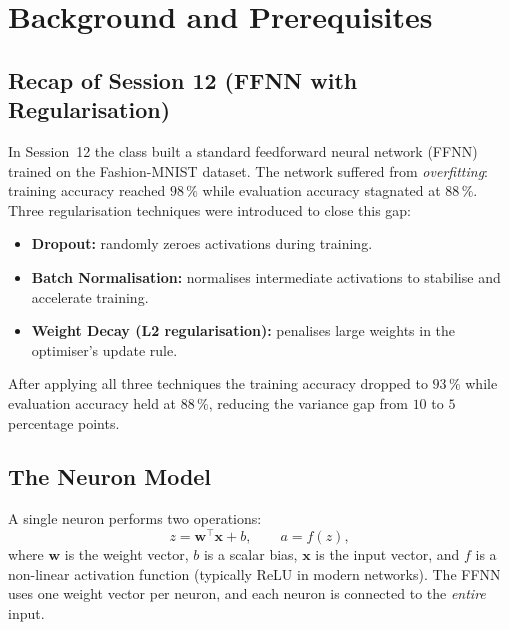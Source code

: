 \documentclass[12pt,a4paper]{article}
\begin{document}
\section{Background and Prerequisites}
\label{sec:background}

\subsection{Recap of Session 12 (FFNN with Regularisation)}
\label{subsec:recap}

In Session~12 the class built a standard feedforward neural network (FFNN)
trained on the Fashion-MNIST dataset.  The network suffered from
\emph{overfitting}: training accuracy reached $98\,\%$ while evaluation
accuracy stagnated at $88\,\%$.  Three regularisation techniques were
introduced to close this gap:

\begin{itemize}[leftmargin=2em]
  \item \textbf{Dropout:} randomly zeroes activations during training.
  \item \textbf{Batch Normalisation:} normalises intermediate activations to
        stabilise and accelerate training.
  \item \textbf{Weight Decay (L2 regularisation):} penalises large weights in
        the optimiser's update rule.
\end{itemize}

After applying all three techniques the training accuracy dropped to $93\,\%$
while evaluation accuracy held at $88\,\%$, reducing the variance gap from
$10$ to $5$ percentage points.

\subsection{The Neuron Model}
\label{subsec:neuron}

A single neuron performs two operations:
\begin{equation}
  z = \mathbf{w}^{\top}\mathbf{x} + b, \qquad
  a = f(z),
  \label{eq:neuron}
\end{equation}
where $\mathbf{w}$ is the weight vector, $b$ is a scalar bias, $\mathbf{x}$
is the input vector, and $f$ is a non-linear activation function (typically
ReLU in modern networks).  The FFNN uses one weight vector per neuron, and
each neuron is connected to the \emph{entire} input.
\end{document}
